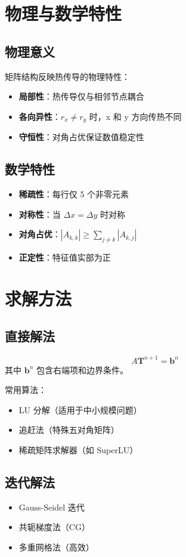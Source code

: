 \documentclass{ctexart}
\begin{document}
\section{物理与数学特性}

\subsection{物理意义}
矩阵结构反映热传导的物理特性：
\begin{itemize}
\item \textbf{局部性}：热传导仅与相邻节点耦合
\item \textbf{各向异性}：$r_x \neq r_y$ 时，x 和 y 方向传热不同
\item \textbf{守恒性}：对角占优保证数值稳定性
\end{itemize}

\subsection{数学特性}
\begin{itemize}
\item \textbf{稀疏性}：每行仅 5 个非零元素
\item \textbf{对称性}：当 $\Delta x = \Delta y$ 时对称
\item \textbf{对角占优}：$|A_{k,k}| \geq \sum_{j \neq k} |A_{k,j}|$
\item \textbf{正定性}：特征值实部为正
\end{itemize}

\section{求解方法}

\subsection{直接解法}
\begin{equation}
A\mathbf{T}^{n+1} = \mathbf{b}^n
\end{equation}
其中 $\mathbf{b}^n$ 包含右端项和边界条件。

常用算法：
\begin{itemize}
\item LU 分解（适用于中小规模问题）
\item 追赶法（特殊五对角矩阵）
\item 稀疏矩阵求解器（如 SuperLU）
\end{itemize}

\subsection{迭代解法}
\begin{itemize}
\item Gauss-Seidel 迭代
\item 共轭梯度法（CG）
\item 多重网格法（高效）
\end{itemize}
\end{document}
